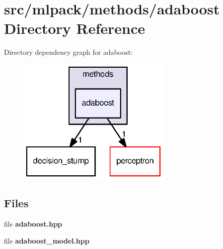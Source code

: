 \section{src/mlpack/methods/adaboost Directory Reference}
\label{dir_23df8455679e8ad547d712804f6863e9}
Directory dependency graph for adaboost\+:
\nopagebreak
\begin{figure}[H]
\begin{center}
\leavevmode
\includegraphics[width=210pt]{dir_23df8455679e8ad547d712804f6863e9_dep}
\end{center}
\end{figure}
\subsection*{Files}
\begin{DoxyCompactItemize}
\item 
file {\bf adaboost.\+hpp}
\item 
file {\bf adaboost\+\_\+model.\+hpp}
\end{DoxyCompactItemize}
